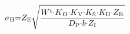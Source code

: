 \begin{equation}
{\sigma }_{\mathrm{H}}\mathrm{=}Z_{\mathrm{E}}\sqrt{\frac{W^{\mathrm{t}}{\mathrm{\cdot }K}_{\mathrm{O}}{\mathrm{\cdot }K}_{\mathrm{V}}\mathrm{\cdot }K_{\mathrm{S}}\mathrm{\cdot }K_{\mathrm{H}}\mathrm{\cdot }Z_{\mathrm{R}}}{D_{\mathrm{P}}\mathrm{\cdot }b\mathrm{\cdot }Z_{\mathrm{I}}}}$$
\end{equation}